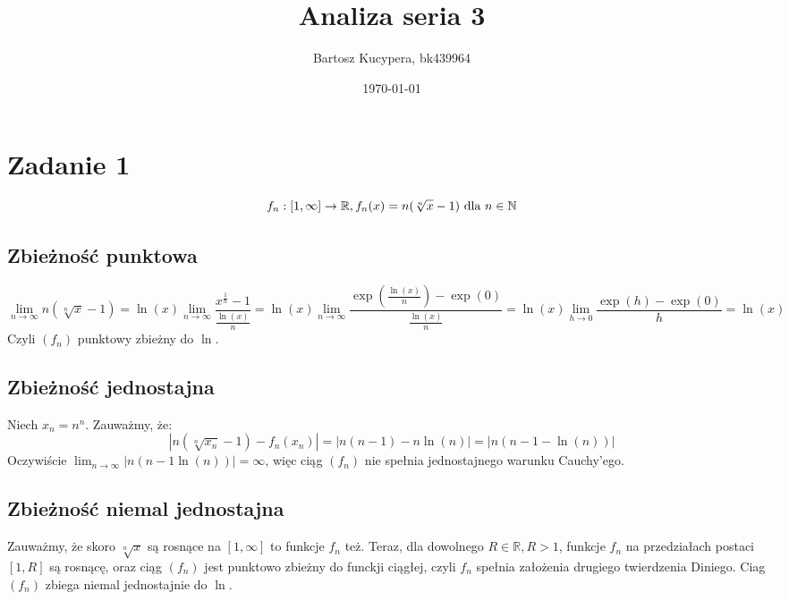 \documentclass{article}
\title{Analiza seria 3}
\author{Bartosz Kucypera, bk439964}
\date{\today}
\begin{document}
\maketitle

\section*{Zadanie 1} 
$$f_n : [1, \infty] \to \mathbb{R}, f_n(x) = n(\sqrt[\leftroot{0} \uproot{0} n]{x} - 1) \mbox{ dla } n \in \mathbb{N}$$

\subsection*{Zbieżność punktowa}
$$ \displaystyle \lim_{n \to \infty} n(\sqrt[n]{x} - 1) = 
\ln(x) \lim_{n \to \infty} \frac{x^\frac{1}{n} -1}{\frac{\ln(x)}{n}} = 
\ln(x) \lim_{n \to \infty} \frac{\exp(\frac{\ln(x)}{n}) - \exp(0)}{\frac{\ln(x)}{n}} = 
\ln(x) \lim_{h \to 0} \frac{\exp(h) - \exp(0)}{h}  = \ln(x)$$
Czyli $(f_n)$ punktowy zbieżny do $\ln$.
\subsection*{Zbieżność jednostajna}
Niech $x_n = n^n$. Zauważmy, że:
$$ |n(\sqrt[n]{x_n}-1) - f_n(x_n)| = |n(n-1) - n\ln(n)| = |n(n-1-\ln(n))| $$
Oczywiście $\lim_{n \to \infty} |n(n-1\ln(n))| = \infty$, więc ciąg $(f_n)$ nie spełnia jednostajnego warunku Cauchy'ego.
\subsection*{Zbieżność niemal jednostajna}
Zauważmy, że skoro $\sqrt[n]{x}$ są rosnące na $[1, \infty]$ to funkcje $f_n$ też. \newline 
Teraz, dla dowolnego $R \in \mathbb{R}, R > 1$, funkcje $f_n$ na przedziałach postaci $[1, R]$ są
rosnącę, oraz ciąg $(f_n)$ jest punktowo zbieżny do funckji ciągłej, czyli $f_n$ spełnia założenia drugiego twierdzenia Diniego. Ciag $(f_n)$ zbiega niemal jednostajnie do $\ln$.
\end{document}
